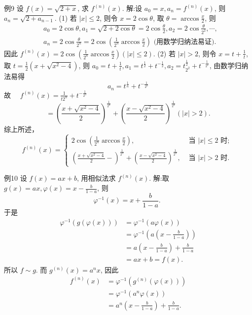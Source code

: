 例9 设 $f(x)=\sqrt{2+x}$, 求 $f^{(n)}(x)$.
解:设 $a_0=x, a_n=f^{(n)}(x)$, 则 $a_n=\sqrt{2+a_{n-1}}$.
(1) 若 $|x| \leqslant 2$, 则令 $x=2 \cos \theta$, 取 $\theta=\arccos \frac{x}{2}$, 则
$$
\begin{aligned}
& a_0=2 \cos \theta, a_1=\sqrt{2+2 \cos \theta}=2 \cos \frac{\theta}{2}, a_2=2 \cos \frac{\theta}{2^2}, \cdots, \\
& a_n=2 \cos \frac{\theta}{2^n}=2 \cos \left(\frac{1}{2^n} \arccos \frac{x}{2}\right) \text { (用数学归纳法易证). }
\end{aligned}
$$
因此 $f^{(n)}(x)=2 \cos \left(\frac{1}{2^n} \arccos \frac{x}{2}\right)(|x| \leqslant 2)$.
(2) 若 $|x|>2$, 则令 $x=t+\frac{1}{t}$, 取 $t=\frac{1}{2}\left(x+\sqrt{x^2-4}\right)$, 则 $a_0=t+ \frac{1}{t}, a_1=t^{\frac{1}{2}}+t^{-\frac{1}{2}}, a_2=t_{2^2}^{\frac{1}{2}}+t^{-\frac{1}{2^2}}$, 由数学归纳法易得
$$
a_n=t^{\frac{1}{n}}+t^{-\frac{1}{2^n}}
$$
故 $\quad f^{(n)}(x)=\frac{1}{t 2^n}+t^{-\frac{1}{2^n}}$
$$
=\left(\frac{x+\sqrt{x^2-4}}{2}\right)^{\frac{1}{2^n}}+\left(\frac{x-\sqrt{x^2-4}}{2}\right)^{\frac{1}{2^n}}(|x|>2) .
$$
综上所述，
$$
f^{(n)}(x)= \begin{cases}2 \cos \left(\frac{1}{2^n} \arccos \frac{x}{2}\right), & \text { 当 }|x| \leqslant 2 \text { 时; } \\ \left(\frac{x+\sqrt{x^2-4}}{2}-\right)^{\frac{1}{2^n}}+\left(\frac{x-\sqrt{x^2-4}}{2}\right)^{\frac{1}{2^n}}, & \text { 当 }|x|>2 \text { 时.
}\end{cases}
$$



例10 设 $f(x)=a x+b$, 用相似法求 $f^{(n)}(x)$.
解:取 $g(x)=a x, \varphi(x)=x-\frac{b}{1-a}$, 则
$$
\varphi^{-1}(x)=x+\frac{b}{1-a} \text {. }
$$
于是
$$
\begin{aligned}
\varphi^{-1}(g(\varphi(x))) & =\varphi^{-1}(a \varphi(x)) \\
& =\varphi^{-1}\left(a\left(x-\frac{b}{1-a}\right)\right) \\
& =a\left(x-\frac{b}{1-a}\right)+\frac{b}{1-a} \\
& =a x+b=f(x) .
\end{aligned}
$$
所以 $f \sim g$. 而 $g^{(n)}(x)=a^n x$, 因此
$$
\begin{aligned}
f^{(n)}(x) & =\varphi^{-1}\left(g^{(n)}(\varphi(x))\right) \\
& =\varphi^{-1}\left(a^n \varphi(x)\right) \\
& =a^n\left(x-\frac{b}{1-a}\right)+\frac{b}{1-a} .
\end{aligned}
$$



